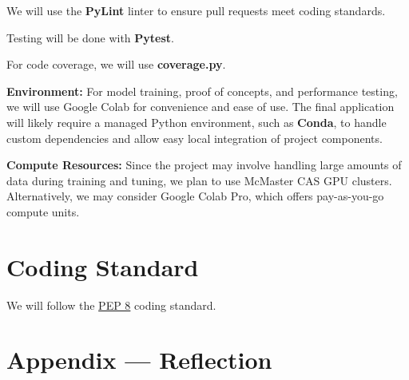 \documentclass{article}
\begin{document}
We will use the \textbf{PyLint} linter to ensure pull requests meet coding standards.

Testing will be done with \textbf{Pytest}.

For code coverage, we will use \textbf{coverage.py}.

\bigskip
\noindent\textbf{Environment:} For model training, proof of concepts, and performance testing, we will use Google Colab for convenience and ease of use. The final application will likely require a managed Python environment, such as \textbf{Conda}, to handle custom dependencies and allow easy local integration of project components.

\bigskip
\noindent\textbf{Compute Resources:} Since the project may involve handling large amounts of data during training and tuning, we plan to use McMaster CAS GPU clusters. Alternatively, we may consider Google Colab Pro, which offers pay-as-you-go compute units.


\section{Coding Standard}

We will follow the \href{https://peps.python.org/pep-0008/}{PEP 8} coding standard.


\newpage{}

\section*{Appendix --- Reflection}



\end{document}
